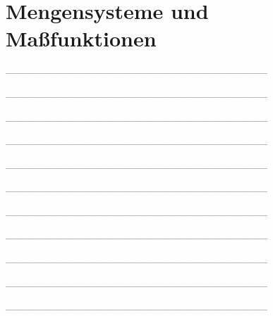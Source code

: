 \setcounter{exercise}{0}

\section{Mengensysteme und Maßfunktionen}

--------------------------------------------------------------------------------



--------------------------------------------------------------------------------



--------------------------------------------------------------------------------



--------------------------------------------------------------------------------



--------------------------------------------------------------------------------



--------------------------------------------------------------------------------



--------------------------------------------------------------------------------



--------------------------------------------------------------------------------



--------------------------------------------------------------------------------



--------------------------------------------------------------------------------



--------------------------------------------------------------------------------



